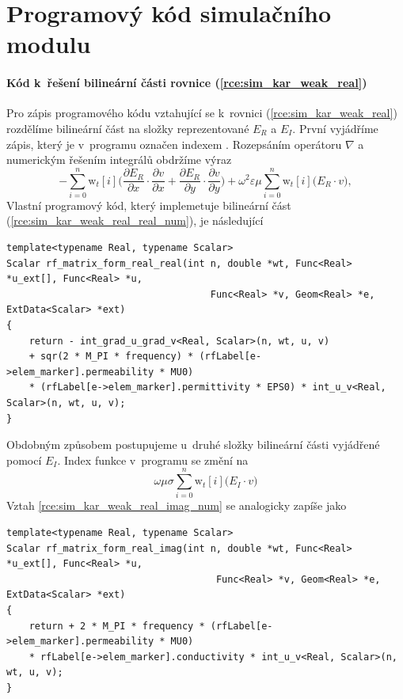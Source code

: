 \chapter{Programový kód simulačního modulu}
\subsubsection*{Kód k~řešení bilineární části rovnice (\ref{rce:sim_kar_weak_real})}
Pro zápis programového kódu vztahující se k~rovnici (\ref{rce:sim_kar_weak_real}) rozdělíme bilineární část na složky reprezentované $E_{R}$ a $E_{I}$. První vyjádříme zápis, který je v~programu označen indexem . Rozepsáním operátoru $\nabla$ a numerickým řešením integrálů obdržíme výraz
\begin{equation}
	-\sum_{i=0}^{n}\mathrm{w}_{t}[i]\bigg(\frac{\partial E_R}{\partial x}\cdot \frac{\partial v}{\partial x} + \frac{\partial E_R}{\partial y}\cdot \frac{\partial v}{\partial y} \bigg) + \omega^{2}\varepsilon\mu\sum_{i=0}^{n}\mathrm{w}_{t}[i]\bigg(E_R\cdot v\bigg),
	\label{rce:sim_kar_weak_real_real_num} 
\end{equation}
Vlastní programový kód, který implemetuje bilineární část (\ref{rce:sim_kar_weak_real_real_num}), je následující

\begin{verbatim}
template<typename Real, typename Scalar>
Scalar rf_matrix_form_real_real(int n, double *wt, Func<Real> *u_ext[], Func<Real> *u,
                                    Func<Real> *v, Geom<Real> *e, ExtData<Scalar> *ext)
{
    return - int_grad_u_grad_v<Real, Scalar>(n, wt, u, v)
    + sqr(2 * M_PI * frequency) * (rfLabel[e->elem_marker].permeability * MU0)
    * (rfLabel[e->elem_marker].permittivity * EPS0) * int_u_v<Real, Scalar>(n, wt, u, v);
}
\end{verbatim}
Obdobným způsobem postupujeme u~druhé složky bilineární části vyjádřené pomocí $E_I$. Index funkce v~programu se změní na 
\begin{equation}
 \omega\mu\sigma\sum_{i=0}^{n}\mathrm{w}_{t}[i]\bigg(E_I\cdot v\bigg)
	\label{rce:sim_kar_weak_real_imag_num} 
\end{equation}
Vztah \ref{rce:sim_kar_weak_real_imag_num} se analogicky zapíše jako
\begin{verbatim}
template<typename Real, typename Scalar>
Scalar rf_matrix_form_real_imag(int n, double *wt, Func<Real> *u_ext[], Func<Real> *u,
                                     Func<Real> *v, Geom<Real> *e, ExtData<Scalar> *ext)
{
    return + 2 * M_PI * frequency * (rfLabel[e->elem_marker].permeability * MU0) 
    * rfLabel[e->elem_marker].conductivity * int_u_v<Real, Scalar>(n, wt, u, v);
}
\end{verbatim}

